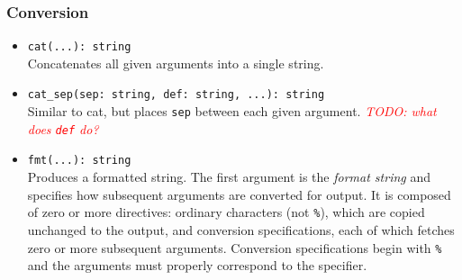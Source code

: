 \documentclass[10pt,landscape]{article}
\def\todo#1{\textit{\textcolor{red}{TODO: #1}}}
\begin{document}
\begin{multicols*}{2}
\subsubsection*{Conversion}

\begin{itemize}
  \item \verb|cat(...): string|\\
    Concatenates all given arguments into a single string.
  \item \verb|cat_sep(sep: string, def: string, ...): string|\\
    Similar to cat, but places \texttt{sep} between each given argument.
    \todo{what does \texttt{def} do?}
  \item \verb|fmt(...): string|\\
    Produces a formatted string. The first argument is the \emph{format string}
    and specifies how subsequent arguments are converted for output. It is
    composed of zero or more directives: ordinary characters (not \verb|%|),
    which are copied unchanged to the output, and conversion specifications,
    each of which fetches zero or more subsequent arguments. Conversion
    specifications begin with \verb|%| and the arguments must properly
    correspond to the specifier.


\end{itemize}
\end{multicols*}
\end{document}

